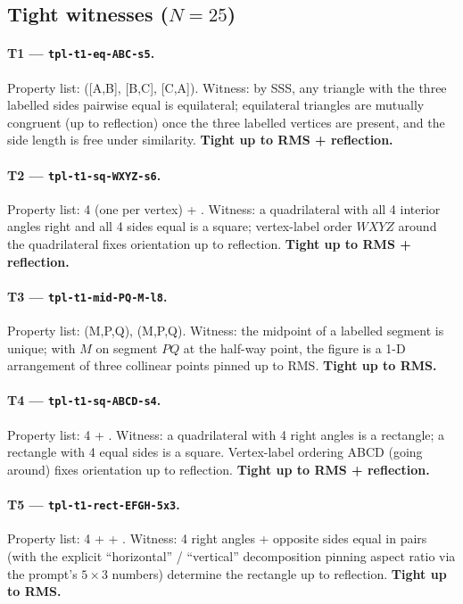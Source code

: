 \subsection{Tight witnesses ($N{=}25$)}
\label{app:completeness_witnesses:tight}

\paragraph{T1 --- \texttt{tpl-t1-eq-ABC-s5}.}
Property list: ([A,B], [B,C], [C,A]).
Witness: by SSS, any triangle with the three labelled sides pairwise equal is equilateral; equilateral triangles are mutually congruent (up to reflection) once the three labelled vertices are present, and the side length is free under similarity.
\textbf{Tight up to RMS + reflection.}

\paragraph{T2 --- \texttt{tpl-t1-sq-WXYZ-s6}.}
Property list: 4  (one per vertex) + .
Witness: a quadrilateral with all 4 interior angles right and all 4 sides equal is a square; vertex-label order $WXYZ$ around the quadrilateral fixes orientation up to reflection.
\textbf{Tight up to RMS + reflection.}

\paragraph{T3 --- \texttt{tpl-t1-mid-PQ-M-l8}.}
Property list: (M,P,Q), (M,P,Q).
Witness: the midpoint of a labelled segment is unique; with $M$ on segment $PQ$ at the half-way point, the figure is a 1-D arrangement of three collinear points pinned up to RMS.
\textbf{Tight up to RMS.}

\paragraph{T4 --- \texttt{tpl-t1-sq-ABCD-s4}.}
Property list: 4  + .
Witness: a quadrilateral with 4 right angles is a rectangle; a rectangle with 4 equal sides is a square. Vertex-label ordering ABCD (going around) fixes orientation up to reflection.
\textbf{Tight up to RMS + reflection.}

\paragraph{T5 --- \texttt{tpl-t1-rect-EFGH-5x3}.}
Property list: 4  +  + .
Witness: 4 right angles + opposite sides equal in pairs (with the explicit ``horizontal'' / ``vertical'' decomposition pinning aspect ratio via the prompt's $5\times 3$ numbers) determine the rectangle up to reflection.
\textbf{Tight up to RMS.}


